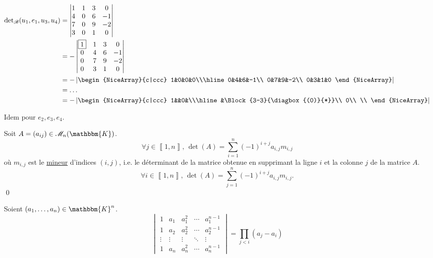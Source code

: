 \begin{exm}
	\begin{align*}
		\det_\mathcal{B}(u_1, e_1, u_3, u_4) &= 
		\begin{vmatrix}
			1&1&3&0\\
			4&0&6&-1\\
			7&0&9&-2\\
			3&0&1&0
		\end{vmatrix}\\
		&= -
		\begin{vmatrix}
			\bx 1 & 1 & 3 & 0\\
			0&4&6&-1\\
			0&7&9&-2\\
			0&3&1&0
		\end{vmatrix}\\
		&= -
		\left|\begin{NiceArray}{c|ccc}
			1&0&0&0\\\hline
			0&4&6&-1\\
			0&7&9&-2\\
			0&3&1&0
		\end{NiceArray}\right|\\
		&= \ldots \\
		&= - \left|
		\begin{NiceArray}{c|ccc}
			1&&0&\\\hline
			 &\Block{3-3}{\diagbox{(0)}{*}}\\
			0\\
			\\
		\end{NiceArray}\right|  \\
	\end{align*}

	Idem pour $e_2, e_3, e_4$.
\end{exm}

\begin{prop}[Laplace]
	Soit $A = (a_{ij}) \in \mathcal{M}_n(\mathbbm{K})$. \[
		\forall j \in \left\llbracket 1,n \right\rrbracket,\, \det(A) = \sum_{i=1}^n (-1)^{i+j} a_{i,j} m_{i,j}
	\] où $m_{i,j}$ est le \underline{mineur} d'indices $(i,j)$, i.e. le déterminant de la matrice obtenue en supprimant la ligne $i$ et la colonne $j$ de la matrice $A$. \[
		\forall i \in \left\llbracket 1,n \right\rrbracket,\,
		\det(A) = \sum_{j=1}^n (-1)^{i+j} a_{i,j} m_{i,j}.
	\]\qed
\end{prop}

\begin{prop}[Vandermonde]
	Soient $(a_1, \ldots, a_n) \in \mathbbm{K}^n$. \[
		\begin{vmatrix}
			1&a_1&a_1^2&\cdots&a_1^{n-1}\\
			1&a_2&a_2^2&\cdots&a_2^{n-1}\\
			\vdots&\vdots&\vdots&\ddots&\vdots\\
			1&a_n&a_n^2&\cdots&a_n^{n-1}
		\end{vmatrix} = \prod_{j<i} (a_j - a_i)
	\]
\end{prop}

